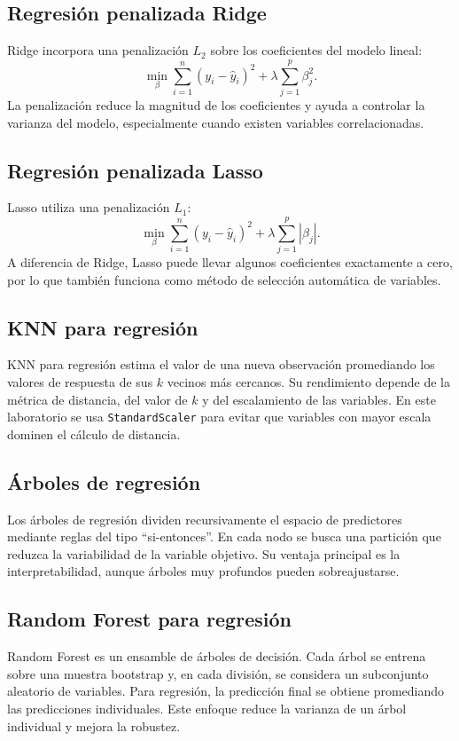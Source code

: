 \documentclass[12pt,letterpaper]{article}
\begin{document}
\subsection{Regresión penalizada Ridge}
Ridge incorpora una penalización $L_2$ sobre los coeficientes del modelo lineal:
\begin{equation}
\min_{\beta} \sum_{i=1}^{n}(y_i-\hat{y}_i)^2 + \lambda\sum_{j=1}^{p}\beta_j^2.
\end{equation}
La penalización reduce la magnitud de los coeficientes y ayuda a controlar la varianza del modelo, especialmente cuando existen variables correlacionadas.

\subsection{Regresión penalizada Lasso}
Lasso utiliza una penalización $L_1$:
\begin{equation}
\min_{\beta} \sum_{i=1}^{n}(y_i-\hat{y}_i)^2 + \lambda\sum_{j=1}^{p}|\beta_j|.
\end{equation}
A diferencia de Ridge, Lasso puede llevar algunos coeficientes exactamente a cero, por lo que también funciona como método de selección automática de variables.

\subsection{KNN para regresión}
KNN para regresión estima el valor de una nueva observación promediando los valores de respuesta de sus $k$ vecinos más cercanos. Su rendimiento depende de la métrica de distancia, del valor de $k$ y del escalamiento de las variables. En este laboratorio se usa \texttt{StandardScaler} para evitar que variables con mayor escala dominen el cálculo de distancia.

\subsection{Árboles de regresión}
Los árboles de regresión dividen recursivamente el espacio de predictores mediante reglas del tipo ``si-entonces''. En cada nodo se busca una partición que reduzca la variabilidad de la variable objetivo. Su ventaja principal es la interpretabilidad, aunque árboles muy profundos pueden sobreajustarse.

\subsection{Random Forest para regresión}
Random Forest es un ensamble de árboles de decisión. Cada árbol se entrena sobre una muestra bootstrap y, en cada división, se considera un subconjunto aleatorio de variables. Para regresión, la predicción final se obtiene promediando las predicciones individuales. Este enfoque reduce la varianza de un árbol individual y mejora la robustez.
\end{document}
